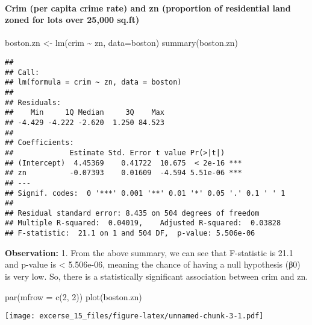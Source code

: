 \documentclass[
]{article}
\newenvironment{Shaded}{\begin{snugshade}}{\end{snugshade}}
\newcommand{\AttributeTok}[1]{\textcolor[rgb]{0.77,0.63,0.00}{#1}}
\newcommand{\DecValTok}[1]{\textcolor[rgb]{0.00,0.00,0.81}{#1}}
\newcommand{\FunctionTok}[1]{\textcolor[rgb]{0.00,0.00,0.00}{#1}}
\newcommand{\NormalTok}[1]{#1}
\newcommand{\OtherTok}[1]{\textcolor[rgb]{0.56,0.35,0.01}{#1}}
\newcommand{\SpecialCharTok}[1]{\textcolor[rgb]{0.00,0.00,0.00}{#1}}
\begin{document}
\hypertarget{crim-per-capita-crime-rate-and-zn-proportion-of-residential-land-zoned-for-lots-over-25000-sq.ft}{%
\paragraph{Crim (per capita crime rate) and zn (proportion of
residential land zoned for lots over 25,000
sq.ft)}\label{crim-per-capita-crime-rate-and-zn-proportion-of-residential-land-zoned-for-lots-over-25000-sq.ft}}

\begin{Shaded}
\begin{Highlighting}[]
\NormalTok{boston.zn }\OtherTok{\textless{}{-}} \FunctionTok{lm}\NormalTok{(crim }\SpecialCharTok{\textasciitilde{}}\NormalTok{ zn, }\AttributeTok{data=}\NormalTok{boston)}
\FunctionTok{summary}\NormalTok{(boston.zn)}
\end{Highlighting}
\end{Shaded}

\begin{verbatim}
## 
## Call:
## lm(formula = crim ~ zn, data = boston)
## 
## Residuals:
##    Min     1Q Median     3Q    Max 
## -4.429 -4.222 -2.620  1.250 84.523 
## 
## Coefficients:
##             Estimate Std. Error t value Pr(>|t|)    
## (Intercept)  4.45369    0.41722  10.675  < 2e-16 ***
## zn          -0.07393    0.01609  -4.594 5.51e-06 ***
## ---
## Signif. codes:  0 '***' 0.001 '**' 0.01 '*' 0.05 '.' 0.1 ' ' 1
## 
## Residual standard error: 8.435 on 504 degrees of freedom
## Multiple R-squared:  0.04019,    Adjusted R-squared:  0.03828 
## F-statistic:  21.1 on 1 and 504 DF,  p-value: 5.506e-06
\end{verbatim}

\textbf{Observation:} 1. From the above summary, we can see that
F-statistic is 21.1 and p-value is \textless{} 5.506e-06, meaning the
chance of having a null hypothesis (β0) is very low. So, there is a
statistically significant association between crim and zn.

\begin{Shaded}
\begin{Highlighting}[]
\FunctionTok{par}\NormalTok{(}\AttributeTok{mfrow =} \FunctionTok{c}\NormalTok{(}\DecValTok{2}\NormalTok{, }\DecValTok{2}\NormalTok{))}
\FunctionTok{plot}\NormalTok{(boston.zn)}
\end{Highlighting}
\end{Shaded}

\texttt{[image: excerse\_15\_files/figure-latex/unnamed-chunk-3-1.pdf]}
\end{document}

